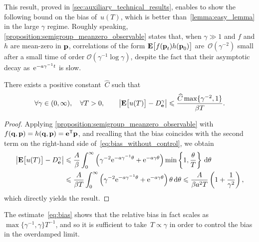 \documentclass[11pt,a4paper]{article}
\begin{document}
This result, proved in \cref{sec:auxiliary_technical_results},
enables to show the following bound on the bias of~$u(T)$,
which is better than~\cref{lemma:easy_lemma} in the large $\gamma$ regime.
Roughly speaking, \cref{proposition:semigroup_meanzero_observable} states that,
when $\gamma \gg 1$ and $f$ and $h$ are mean-zero in $\boldsymbol{\mathbf p}$,
correlations of the form $\mathbf{E} \bigl[ f(\boldsymbol{\mathbf p}_t) h(\boldsymbol{\mathbf p}_0) \bigr]$ are~$\mathcal O(\gamma^{-2})$ small after a small time of order $\mathcal O(\gamma^{-1} \log \gamma)$,
despite the fact that their asymptotic decay as~$\mathrm{e}^{- a \gamma^{-1} t}$ is slow.
\begin{corollary}
    \label{corollary:better_bias}
    There exists a positive constant~$\widehat C$ such that
    \begin{equation}
        \label{eq:bias}
        \forall \gamma \in (0, \infty),
        \quad
        \forall T > 0,
        \qquad
        \abs{\expect \bigl[u(T)\bigr] - D_{\vect e}^{\gamma}}
        \leq
        \frac{\widehat C \max \{\gamma^{-2}, 1\}}{\beta T}.
    \end{equation}
\end{corollary}
\begin{proof}
    Applying \cref{proposition:semigroup_meanzero_observable} with $f(\boldsymbol{\mathbf q}, \boldsymbol{\mathbf p}) = h(\boldsymbol{\mathbf q}, \boldsymbol{\mathbf p}) = \boldsymbol{\mathbf e}^\mathsf T \boldsymbol{\mathbf p}$,
    and recalling that the bias coincides with the second term on the right-hand side of~\eqref{eq:bias_without_control},
    we obtain
    \begin{align}
        \label{eq:refined_bound_for_u}
        \abs{\expect \bigl[u(T)\bigr] - D^{\gamma}_{\vect e}}
        &\leq \frac{A}{\beta} \int_{0}^{\infty} \left( \gamma^{-2} \e^{- a \gamma^{-1} \theta} + \e^{-a  \gamma \theta} \right)  \min \left\{1,  \frac{\theta}{T} \right\} \, \d \theta \\
        &\leq \frac{A}{\beta T} \int_{0}^{\infty} \left( \gamma^{-2} \e^{- a \gamma^{-1} \theta} + \e^{-a  \gamma \theta} \right)  \theta \, \d \theta
        \leq \frac{A}{\beta a^2 T} \left(1 + \frac{1}{\gamma^2} \right),
    \end{align}
    which directly yields the result.
\end{proof}
The estimate~\eqref{eq:bias} shows that the relative bias in fact scales as~$\max\{\gamma^{-1}, \gamma\} T^{-1}$,
and so it is sufficient to take~$T \propto \gamma$ in order to control the bias in the overdamped limit.
\end{document}
